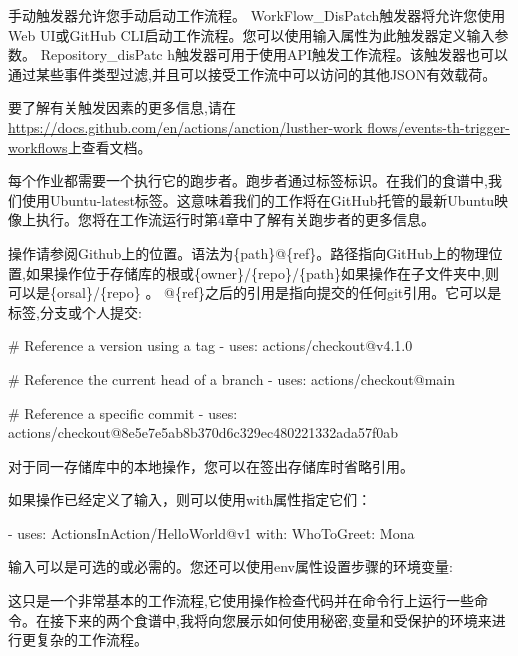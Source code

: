 手动触发器允许您手动启动工作流程。 WorkFlow\_DisPatch触发器将允许您使用Web UI或GitHub CLI启动工作流程。您可以使用输入属性为此触发器定义输入参数。 Repository\_disPatc h触发器可用于使用API触发工作流程。该触发器也可以通过某些事件类型过滤,并且可以接受工作流中可以访问的其他JSON有效载荷。

要了解有关触发因素的更多信息,请在\url{https://docs.github.com/en/actions/anction/lusther-work flows/events-th-trigger-workflows}上查看文档。


每个作业都需要一个执行它的跑步者。跑步者通过标签标识。在我们的食谱中,我们使用Ubuntu-latest标签。这意味着我们的工作将在GitHub托管的最新Ubuntu映像上执行。您将在工作流运行时第4章中了解有关跑步者的更多信息。


操作请参阅Github上的位置。语法为\{path\}@\{ref\}。路径指向GitHub上的物理位置,如果操作位于存储库的根或\{owner\}/\{repo\}/\{path\}如果操作在子文件夹中,则可以是\{orsal\}/\{repo\} 。 @\{ref\}之后的引用是指向提交的任何git引用。它可以是标签,分支或个人提交:

\begin{shell}
# Reference a version using a tag
- uses: actions/checkout@v4.1.0

# Reference the current head of a branch
- uses: actions/checkout@main

# Reference a specific commit
- uses: actions/checkout@8e5e7e5ab8b370d6c329ec480221332ada57f0ab
\end{shell}

对于同一存储库中的本地操作，您可以在签出存储库时省略引用。

如果操作已经定义了输入，则可以使用with属性指定它们：

\begin{shell}
- uses: ActionsInAction/HelloWorld@v1
  with:
    WhoToGreet: Mona
\end{shell}

输入可以是可选的或必需的。您还可以使用env属性设置步骤的环境变量:



这只是一个非常基本的工作流程,它使用操作检查代码并在命令行上运行一些命令。在接下来的两个食谱中,我将向您展示如何使用秘密,变量和受保护的环境来进行更复杂的工作流程。